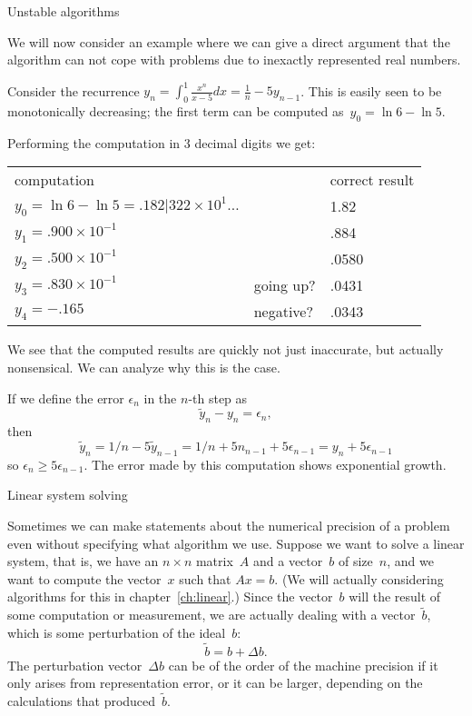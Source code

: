 
 {Unstable algorithms}

We will now consider an example where we can give a direct argument
that the algorithm can not cope with problems due to inexactly
represented real numbers.

Consider the recurrence $y_n=\int_0^1 \frac{x^n}{x-5}dx =
\frac1n-5y_{n-1}$.%
This is easily seen to be monotonically decreasing; the first term can
be computed as~$y_0=\ln 6 - \ln 5$.

Performing the computation in 3 decimal digits we get:

\begin{tabular}{lll}
  computation&&correct result\\
  $y_0=\ln 6 - \ln 5=.182|322\times 10^{1}\ldots$&&1.82\\
  $y_1=.900\times 10^{-1}$&&.884\\
  $y_2=.500\times 10^{-1}$&&.0580\\
  $y_3=.830\times 10^{-1}$&going up?&.0431\\
  $y_4=-.165$&negative?&.0343
\end{tabular}

We see that the computed results are quickly not just inaccurate, but
actually nonsensical. We can analyze why this is the case.

If we define the error $\epsilon_n$ in the $n$-th step as
\[ \tilde y_n-y_n=\epsilon_n,\] then
\[ \tilde y_n=1/n-5\tilde y_{n-1}=1/n+5n_{n-1}+5\epsilon_{n-1}
    = y_n+5\epsilon_{n-1} \]
so $\epsilon_n\geq 5\epsilon_{n-1}$. The error made by this
computation shows exponential growth.

 {Linear system solving}

Sometimes we can make statements about the numerical precision of a
problem even without specifying what algorithm we use. Suppose we want
to solve a linear system, that is, we have an $n\times n$ matrix~$A$
and a vector~$b$ of size~$n$, and we want to compute the vector~$x$
such that $Ax=b$. (We will actually considering algorithms for this in
chapter~\ref{ch:linear}.) Since the vector~$b$ will the result of some
computation or measurement, we are actually dealing with a
vector~$\tilde b$, which is some perturbation of the ideal~$b$:
\[ \tilde b =  b+\Delta b. \]
The perturbation vector~$\Delta b$ can be of the order of the machine
precision if it only arises from representation error, or it can be
larger, depending on the calculations that produced~$\tilde b$.

